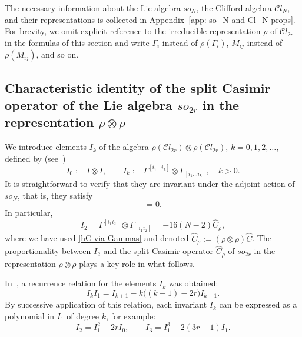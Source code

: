 \documentclass[a4paper]{article}
\newcommand{\Cl}{\mathcal{C}l}
\newcommand{\hC}{\widehat{C}}
\renewcommand{\=}{\ =\ }
\numberwithin{equation}{section}
\theoremstyle{remark}
\begin{document}
The necessary information about the Lie algebra $so_N$, the Clifford algebra $\Cl_N$, and their representations is collected in Appendix~\ref{app: so_N and Cl_N props}. For brevity, we omit explicit reference to the irreducible representation $\rho$ of $\Cl_{2r}$ in the formulas of this section and write $\Gamma_i$ instead of $\rho(\Gamma_i)$, $M_{ij}$ instead of $\rho(M_{ij})$, and so on.

\subsection{Characteristic identity of the split Casimir operator of the Lie algebra $so_{2r}$ in the representation $\rho\otimes \rho$}\label{Sec: 3.1}

We introduce elements $I_k$ of the algebra $\rho(\Cl_{2r})\otimes \rho(\Cl_{2r})$, $k=0,1,2,\dots$, defined by (see~\cite{IsKarKir})
\begin{equation}\label{Ik Def}
I_0:=I\otimes I,\qquad
I_k:=\Gamma^{[i_1\dots i_k]}\otimes \Gamma_{[i_1\dots i_k]},\quad k>0.
\end{equation}
It is straightforward to verify that they are invariant under the adjoint action of $so_N$, that is, they satisfy
\begin{equation}
[M_{ij}\otimes I+I\otimes M_{ij},I_k]=0.
\end{equation}
In particular,
\begin{equation}\label{I2 via hC}
I_2=\Gamma^{[i_1 i_2]}\otimes \Gamma_{[i_1 i_2]}
=-16(N-2)\hC_\rho,
\end{equation}
where we have used \eqref{hC via Gammas} and denoted $\hC_\rho:=(\rho\otimes \rho)\hC$. The proportionality between $I_2$ and the split Casimir operator $\hC_\rho$ of $so_{2r}$ in the representation $\rho\otimes \rho$ plays a key role in what follows.

In~\cite{IsKarKir}, a recurrence relation for the elements $I_k$ was obtained:
\begin{equation}\label{IkI1 relation}
I_k I_1 = I_{k+1} - k\bigl((k-1)-2r\bigr) I_{k-1}.
\end{equation}
By successive application of this relation, each invariant $I_k$ can be expressed as a polynomial in $I_1$ of degree $k$, for example:
\begin{equation}\label{I_2, I_3 via I_1 example}
I_2 = I_1^2 - 2r I_0,
\qquad
I_3 = I_1^3 - 2(3r-1) I_1.
\end{equation}
\end{document}
